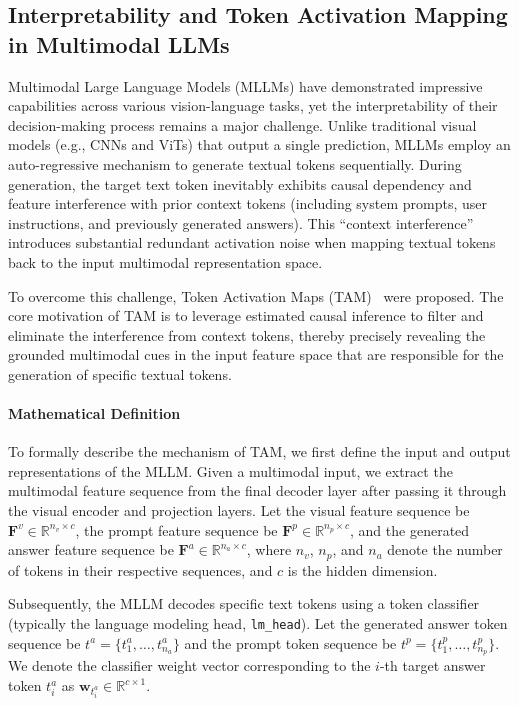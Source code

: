 \documentclass[12pt, conference, letterpaper]{IEEEtran}
\begin{document}
\subsection{Interpretability and Token Activation Mapping in Multimodal LLMs}
\label{sec:interpretability_tam_background}
Multimodal Large Language Models (MLLMs) have demonstrated impressive capabilities across various vision-language tasks, yet the interpretability of their decision-making process remains a major challenge. Unlike traditional visual models (e.g., CNNs and ViTs) that output a single prediction, MLLMs employ an auto-regressive mechanism to generate textual tokens sequentially. During generation, the target text token inevitably exhibits causal dependency and feature interference with prior context tokens (including system prompts, user instructions, and previously generated answers). This ``context interference'' introduces substantial redundant activation noise when mapping textual tokens back to the input multimodal representation space. 

To overcome this challenge, Token Activation Maps (TAM)~\cite{li2025token} were proposed. The core motivation of TAM is to leverage estimated causal inference to filter and eliminate the interference from context tokens, thereby precisely revealing the grounded multimodal cues in the input feature space that are responsible for the generation of specific textual tokens.

\paragraph{Mathematical Definition}
To formally describe the mechanism of TAM, we first define the input and output representations of the MLLM. Given a multimodal input, we extract the multimodal feature sequence from the final decoder layer after passing it through the visual encoder and projection layers. Let the visual feature sequence be $\mathbf{F}^v \in \mathbb{R}^{n_v \times c}$, the prompt feature sequence be $\mathbf{F}^p \in \mathbb{R}^{n_p \times c}$, and the generated answer feature sequence be $\mathbf{F}^a \in \mathbb{R}^{n_a \times c}$, where $n_v$, $n_p$, and $n_a$ denote the number of tokens in their respective sequences, and $c$ is the hidden dimension.

Subsequently, the MLLM decodes specific text tokens using a token classifier (typically the language modeling head, \texttt{lm\_head}). Let the generated answer token sequence be $t^a = \{t^a_1, \dots, t^a_{n_a}\}$ and the prompt token sequence be $t^p = \{t^p_1, \dots, t^p_{n_p}\}$. We denote the classifier weight vector corresponding to the $i$-th target answer token $t^a_i$ as $\mathbf{w}_{t^a_i} \in \mathbb{R}^{c \times 1}$.
\end{document}
